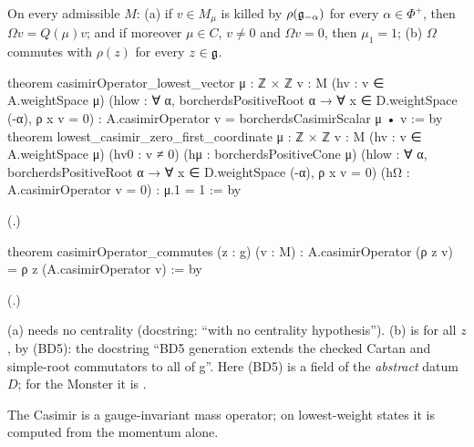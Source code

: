 \begin{theorem}\label{ch18:thm:casimir}
On every admissible $M$: (a) if $v\in M_\mu$ is killed by $\rho(\mathfrak{g}_{-\alpha})$ for every $\alpha\in\Phi^+$, then $\Omega v=Q(\mu)v$; and if
moreover $\mu\in C$, $v\neq0$ and $\Omega v=0$, then $\mu_1=1$; (b) $\Omega$ commutes with $\rho(z)$ for every $z\in\mathfrak{g}$.
\end{theorem}
\begin{leancode}
theorem casimirOperator_lowest_vector {μ : ℤ × ℤ} {v : M}
    (hv : v ∈ A.weightSpace μ)
    (hlow : ∀ α, borcherdsPositiveRoot α → ∀ x ∈ D.weightSpace (-α), ρ x v = 0) :
    A.casimirOperator v = borcherdsCasimirScalar μ • v := by
theorem lowest_casimir_zero_first_coordinate {μ : ℤ × ℤ} {v : M}
    (hv : v ∈ A.weightSpace μ) (hv0 : v ≠ 0) (hμ : borcherdsPositiveCone μ)
    (hlow : ∀ α, borcherdsPositiveRoot α → ∀ x ∈ D.weightSpace (-α), ρ x v = 0)
    (hΩ : A.casimirOperator v = 0) : μ.1 = 1 := by
\end{leancode}
(.)
\begin{leancode}
theorem casimirOperator_commutes (z : g) (v : M) :
    A.casimirOperator (ρ z v) = ρ z (A.casimirOperator v) := by
\end{leancode}
(.)
\begin{dictionary}
(a) needs no centrality (docstring: ``with no centrality hypothesis'').  (b) is for all $z$, by (BD5): the docstring
``BD5 generation extends the checked Cartan and simple-root commutators to all of g''.  Here (BD5) is a field of the
\emph{abstract} datum $D$; for the Monster it is .
\end{dictionary}
\begin{physics}The Casimir is a gauge-invariant mass operator; on lowest-weight states it is computed from the momentum alone.\end{physics}
